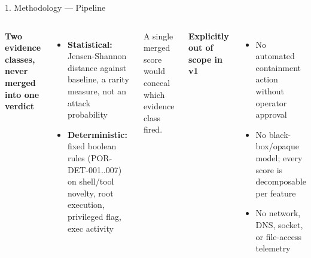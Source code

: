 \documentclass[aspectratio=169, 11pt]{beamer}
\begin{document}
\begin{frame}{1. Methodology --- Pipeline}
\vspace{4mm}
\begin{columns}[T]
\footnotesize
\textbf{Two evidence classes, never merged into one verdict}
\begin{itemize}\setlength\itemsep{1pt}
  \item \textbf{Statistical:} Jensen-Shannon distance against baseline, a
        rarity measure, not an attack probability
  \item \textbf{Deterministic:} fixed boolean rules (POR-DET-001..007) on
        shell/tool novelty, root execution, privileged flag, exec activity
\end{itemize}
A single merged score would conceal which evidence class fired.

\footnotesize
\textbf{Explicitly out of scope in v1}
\begin{itemize}\setlength\itemsep{1pt}
  \item No automated containment action without operator approval
  \item No black-box/opaque model; every score is decomposable per feature
  \item No network, DNS, socket, or file-access telemetry
\end{itemize}
\end{columns}
\end{frame}
\end{document}
